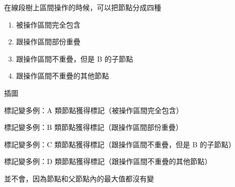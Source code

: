 \begin{frame}{}
    在線段樹上區間操作的時候，可以把節點分成四種

    \begin{enumerate}[A]
        \item 被操作區間完全包含
        \item 跟操作區間部份重疊
        \item 跟操作區間不重疊，但是 B 的子節點
        \item 跟操作區間不重疊的其他節點
    \end{enumerate}
\end{frame}

\begin{frame}{}
    \todo 插圖
\end{frame}

\begin{frame}{}
     {
        標記變多例：A 類節點獲得標記（被操作區間完全包含）
    }

     {
        標記變多例：B 類節點獲得標記（跟操作區間部份重疊）
    }

     {
        標記變多例：C 類節點獲得標記（跟操作區間不重疊，但是 B 的子節點）
    }

     {
        標記變多例：D 類節點獲得標記（跟操作區間不重疊的其他節點）
        
        並不會，因為節點和父節點內的最大值都沒有變
    }
\end{frame}

